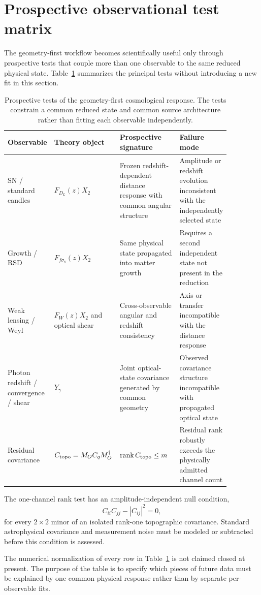 \section{Prospective observational test matrix}
\label{sec:prospective-test-matrix}

The geometry-first workflow becomes scientifically useful only through
prospective tests that couple more than one observable to the same reduced
physical state. Table~\ref{tab:prospective-tests} summarizes the principal
tests without introducing a new fit in this section.

\begin{table}[htbp]
\centering
\begin{tabular}{@{}p{0.17\linewidth} p{0.22\linewidth} p{0.28\linewidth} p{0.20\linewidth}@{}}
\textbf{Observable} & \textbf{Theory object} & \textbf{Prospective signature} & \textbf{Failure mode}\\
\hline
SN / standard candles & $F_{D_L}(z)X_2$ &
Frozen redshift-dependent distance response with common angular structure &
Amplitude or redshift evolution inconsistent with the independently selected state\\[0.5em]

Growth / RSD & $F_{f\sigma_8}(z)X_2$ &
Same physical state propagated into matter growth &
Requires a second independent state not present in the reduction\\[0.5em]

Weak lensing / Weyl & $F_W(z)X_2$ and optical shear &
Cross-observable angular and redshift consistency &
Axis or transfer incompatible with the distance response\\[0.5em]

Photon redshift / convergence / shear & $Y_\gamma$ &
Joint optical-state covariance generated by common geometry &
Observed covariance structure incompatible with propagated optical state\\[0.5em]

Residual covariance & $C_{\rm topo}=M_OC_qM_O^\dagger$ &
$\operatorname{rank}C_{\rm topo}\le m$ &
Residual rank robustly exceeds the physically admitted channel count\\
\end{tabular}
\caption{Prospective tests of the geometry-first cosmological response. The tests constrain a common reduced state and common source architecture rather than fitting each observable independently.}
\label{tab:prospective-tests}
\end{table}

The one-channel rank test has an amplitude-independent null condition,
\begin{equation}
C_{ii}C_{jj}-|C_{ij}|^2=0,
\end{equation}
for every $2\times2$ minor of an isolated rank-one topographic covariance.
Standard astrophysical covariance and measurement noise must be modeled or
subtracted before this condition is assessed.

The numerical normalization of every row in Table~\ref{tab:prospective-tests}
is not claimed closed at present. The purpose of the table is to specify which
pieces of future data must be explained by one common physical response rather
than by separate per-observable fits.
